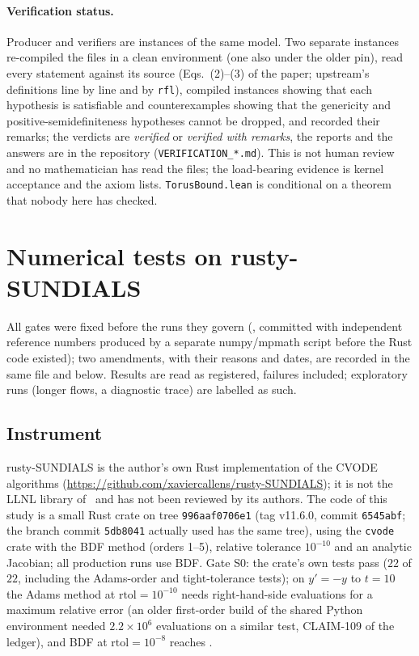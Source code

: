\documentclass[11pt,a4paper]{article}
\begin{document}
\paragraph{Verification status.} Producer and verifiers are instances of the same model. Two separate instances re-compiled
the files in a clean environment (one also under the older pin), read every statement against its source (Eqs.~(2)--(3) of the paper;
upstream's definitions line by line and by \texttt{rfl}), compiled instances showing that each hypothesis is satisfiable and
counterexamples showing that the genericity and positive-semidefiniteness hypotheses cannot be dropped, and recorded their remarks;
the verdicts are \emph{verified} or \emph{verified with remarks}, the reports and the answers are in the repository
(\texttt{VERIFICATION\_*.md}). This is not human review and no mathematician has read the files; the load-bearing evidence is
kernel acceptance and the axiom lists. \texttt{TorusBound.lean} is conditional on a theorem that nobody here has checked.

\section{Numerical tests on rusty-SUNDIALS}\label{sec:numerics}

All gates were fixed before the runs they govern (, committed with
independent reference numbers produced by a separate numpy/mpmath script before the Rust code existed); two amendments, with their
reasons and dates, are recorded in the same file and below. Results are read as registered, failures included; exploratory runs
(longer flows, a diagnostic trace) are labelled as such.

\subsection{Instrument}

rusty-SUNDIALS is the author's own Rust implementation of the CVODE algorithms
(\url{https://github.com/xaviercallens/rusty-SUNDIALS}); it is not the LLNL library of~\cite{Hindmarsh2005} and has not been reviewed
by its authors. The code of this study is a small Rust crate on tree \texttt{996aaf0706e1} (tag v11.6.0, commit \texttt{6545abf};
the branch commit \texttt{5db8041} actually used has the same tree), using the \texttt{cvode} crate with the BDF method (orders 1--5),
relative tolerance $10^{-10}$ and an analytic Jacobian; all production runs use BDF. Gate S0: the crate's own tests pass ($22$ of $22$,
including the Adams-order and tight-tolerance tests); on $y'=-y$ to $t=10$ the Adams method at $\mathrm{rtol}=10^{-10}$ needs
\SzeroAdamsRhs{} right-hand-side evaluations for a maximum relative error \SzeroAdamsErr{} (an older first-order build of the shared
Python environment needed $2.2\times10^{6}$ evaluations on a similar test, CLAIM-109 of the ledger), and BDF at
$\mathrm{rtol}=10^{-8}$ reaches \SzeroBdfErr.
\end{document}
